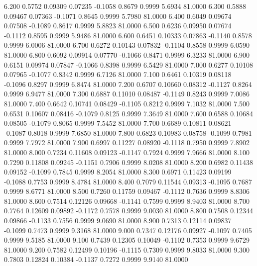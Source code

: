    6.200   0.5752   0.09309   0.07235  -0.1058   0.8679   0.9999   5.6934  81.0000
   6.300   0.5888   0.09467   0.07363  -0.1071   0.8645   0.9999   5.7980  81.0000
   6.400   0.6049   0.09674   0.07508  -0.1089   0.8617   0.9999   5.8823  81.0000
   6.500   0.6236   0.09950   0.07674  -0.1112   0.8595   0.9999   5.9486  81.0000
   6.600   0.6451   0.10333   0.07863  -0.1140   0.8578   0.9999   6.0006  81.0000
   6.700   0.6272   0.10143   0.07832  -0.1104   0.8558   0.9999   6.0590  81.0000
   6.800   0.6092   0.09914   0.07770  -0.1066   0.8471   0.9999   6.3233  81.0000
   6.900   0.6151   0.09974   0.07847  -0.1066   0.8398   0.9999   6.5429  81.0000
   7.000   0.6277   0.10108   0.07965  -0.1077   0.8342   0.9999   6.7126  81.0000
   7.100   0.6461   0.10319   0.08118  -0.1096   0.8297   0.9999   6.8474  81.0000
   7.200   0.6707   0.10660   0.08312  -0.1127   0.8264   0.9999   6.9477  81.0000
   7.300   0.6887   0.11010   0.08487  -0.1149   0.8243   0.9999   7.0086  81.0000
   7.400   0.6642   0.10741   0.08429  -0.1105   0.8212   0.9999   7.1032  81.0000
   7.500   0.6531   0.10607   0.08416  -0.1079   0.8125   0.9999   7.3649  81.0000
   7.600   0.6588   0.10684   0.08505  -0.1079   0.8065   0.9999   7.5452  81.0000
   7.700   0.6689   0.10811   0.08621  -0.1087   0.8018   0.9999   7.6850  81.0000
   7.800   0.6823   0.10983   0.08758  -0.1099   0.7981   0.9999   7.7972  81.0000
   7.900   0.6997   0.11227   0.08920  -0.1118   0.7950   0.9999   7.8902  81.0000
   8.000   0.7234   0.11608   0.09123  -0.1147   0.7924   0.9999   7.9666  81.0000
   8.100   0.7290   0.11808   0.09245  -0.1151   0.7906   0.9999   8.0208  81.0000
   8.200   0.6982   0.11438   0.09152  -0.1099   0.7845   0.9999   8.2054  81.0000
   8.300   0.6971   0.11423   0.09199  -0.1088   0.7753   0.9999   8.4784  81.0000
   8.400   0.7079   0.11544   0.09313  -0.1095   0.7687   0.9999   8.6771  81.0000
   8.500   0.7260   0.11759   0.09467  -0.1112   0.7636   0.9999   8.8306  81.0000
   8.600   0.7514   0.12126   0.09668  -0.1141   0.7599   0.9999   8.9403  81.0000
   8.700   0.7764   0.12609   0.09892  -0.1172   0.7578   0.9999   9.0030  81.0000
   8.800   0.7508   0.12344   0.09866  -0.1133   0.7556   0.9999   9.0690  81.0000
   8.900   0.7313   0.12114   0.09837  -0.1099   0.7473   0.9999   9.3168  81.0000
   9.000   0.7347   0.12176   0.09927  -0.1097   0.7405   0.9999   9.5185  81.0000
   9.100   0.7439   0.12305   0.10049  -0.1102   0.7353   0.9999   9.6729  81.0000
   9.200   0.7582   0.12499   0.10196  -0.1115   0.7309   0.9999   9.8033  81.0000
   9.300   0.7803   0.12824   0.10384  -0.1137   0.7272   0.9999   9.9140  81.0000
